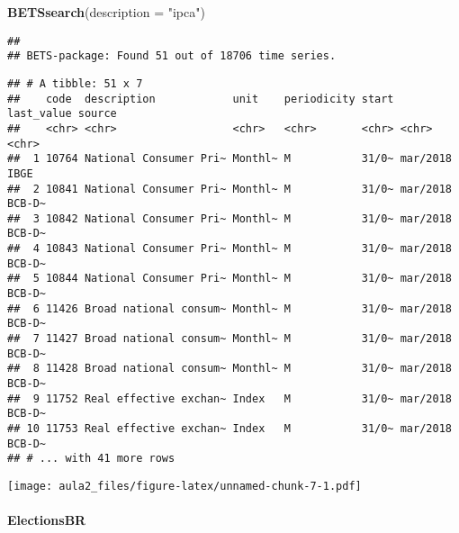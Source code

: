 \documentclass[]{article}
\newenvironment{Shaded}{\begin{snugshade}}{\end{snugshade}}
\newcommand{\KeywordTok}[1]{\textcolor[rgb]{0.13,0.29,0.53}{\textbf{#1}}}
\newcommand{\DataTypeTok}[1]{\textcolor[rgb]{0.13,0.29,0.53}{#1}}
\newcommand{\DecValTok}[1]{\textcolor[rgb]{0.00,0.00,0.81}{#1}}
\newcommand{\StringTok}[1]{\textcolor[rgb]{0.31,0.60,0.02}{#1}}
\newcommand{\NormalTok}[1]{#1}
\let\oldparagraph\paragraph
\renewcommand{\paragraph}[1]{\oldparagraph{#1}\mbox{}}
\begin{document}
\begin{Shaded}
\begin{Highlighting}[]
\KeywordTok{BETSsearch}\NormalTok{(}\DataTypeTok{description =} \StringTok{"ipca"}\NormalTok{)}
\end{Highlighting}
\end{Shaded}

\begin{verbatim}
## 
## BETS-package: Found 51 out of 18706 time series.
\end{verbatim}

\begin{verbatim}
## # A tibble: 51 x 7
##    code  description            unit    periodicity start last_value source
##    <chr> <chr>                  <chr>   <chr>       <chr> <chr>      <chr> 
##  1 10764 National Consumer Pri~ Monthl~ M           31/0~ mar/2018   IBGE  
##  2 10841 National Consumer Pri~ Monthl~ M           31/0~ mar/2018   BCB-D~
##  3 10842 National Consumer Pri~ Monthl~ M           31/0~ mar/2018   BCB-D~
##  4 10843 National Consumer Pri~ Monthl~ M           31/0~ mar/2018   BCB-D~
##  5 10844 National Consumer Pri~ Monthl~ M           31/0~ mar/2018   BCB-D~
##  6 11426 Broad national consum~ Monthl~ M           31/0~ mar/2018   BCB-D~
##  7 11427 Broad national consum~ Monthl~ M           31/0~ mar/2018   BCB-D~
##  8 11428 Broad national consum~ Monthl~ M           31/0~ mar/2018   BCB-D~
##  9 11752 Real effective exchan~ Index   M           31/0~ mar/2018   BCB-D~
## 10 11753 Real effective exchan~ Index   M           31/0~ mar/2018   BCB-D~
## # ... with 41 more rows
\end{verbatim}

\begin{Shaded}
\end{Shaded}

\texttt{[image: aula2\_files/figure-latex/unnamed-chunk-7-1.pdf]}

\paragraph{ElectionsBR}\label{electionsbr}
\end{document}
